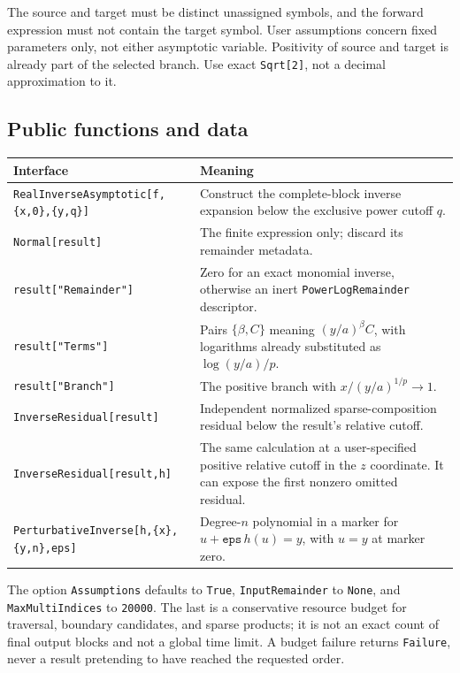 \documentclass[11pt,a4paper]{article}
\numberwithin{equation}{section}
\theoremstyle{definition}
\theoremstyle{remark}
\begin{document}
The source and target must be distinct unassigned symbols, and the forward
expression must not contain the target symbol. User assumptions concern
fixed parameters only, not either asymptotic variable. Positivity of source
and target is already part of the selected branch. Use exact
\texttt{Sqrt[2]}, not a decimal approximation to it.

\subsection{Public functions and data}

\begingroup\small
\begin{longtable}{>{\raggedright\arraybackslash}p{}>{\raggedright\arraybackslash}p{}}
\toprule
Interface & Meaning\\\midrule\endhead
\texttt{RealInverseAsymptotic[}\newline\texttt{f,\{x,0\},\{y,q\}]} &
Construct the complete-block inverse expansion below the exclusive power cutoff $q$.\\
\texttt{Normal[result]} &
The finite expression only; discard its remainder metadata.\\
\texttt{result["Remainder"]} &
Zero for an exact monomial inverse, otherwise an inert \texttt{PowerLogRemainder} descriptor.\\
\texttt{result["Terms"]} &
Pairs $\{\beta,C\}$ meaning $(y/a)^\beta C$, with logarithms already substituted as $\log(y/a)/p$.\\
\texttt{result["Branch"]} &
The positive branch with $x/(y/a)^{1/p}\to1$.\\
\texttt{InverseResidual[result]} &
Independent normalized sparse-composition residual below the result's relative cutoff.\\
\texttt{InverseResidual[result,h]} &
The same calculation at a user-specified positive relative cutoff in the $z$ coordinate. It can expose the first nonzero omitted residual.\\
\texttt{PerturbativeInverse[}\newline\texttt{h,\{x\},\{y,n\},eps]} &
Degree-$n$ polynomial in a marker for $u+\texttt{eps}\,h(u)=y$, with $u=y$ at marker zero.\\
\bottomrule
\end{longtable}
\endgroup

The option \texttt{Assumptions} defaults to \texttt{True},
\texttt{InputRemainder} to \texttt{None}, and
\texttt{MaxMultiIndices} to \texttt{20000}. The last is a conservative resource
budget for traversal, boundary candidates, and sparse products; it is not
an exact count of final output blocks and not a global time limit.
A budget failure returns \texttt{Failure}, never a result pretending to have
reached the requested order.
\end{document}
